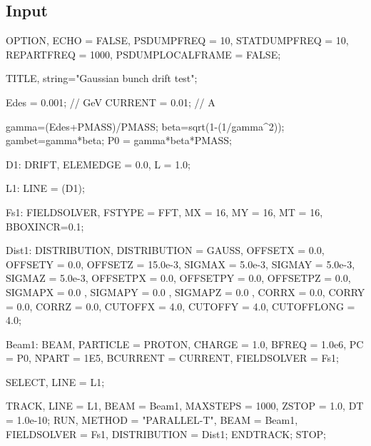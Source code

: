 \subsection{\opal Input}
\begin{longexample}
OPTION, ECHO = FALSE, PSDUMPFREQ = 10,
STATDUMPFREQ = 10, REPARTFREQ = 1000,
PSDUMPLOCALFRAME = FALSE;

TITLE, string="Gaussian bunch drift test";

Edes    = 0.001;        // GeV
CURRENT = 0.01;  // A

gamma=(Edes+PMASS)/PMASS;
beta=sqrt(1-(1/gamma^2));
gambet=gamma*beta;
P0 = gamma*beta*PMASS;

D1: DRIFT, ELEMEDGE = 0.0, L = 1.0;

L1: LINE = (D1);

Fs1: FIELDSOLVER, FSTYPE = FFT, MX = 16, MY = 16, MT = 16, BBOXINCR=0.1;

Dist1: DISTRIBUTION, DISTRIBUTION = GAUSS,
       OFFSETX = 0.0, OFFSETY = 0.0, OFFSETZ = 15.0e-3,
       SIGMAX = 5.0e-3, SIGMAY = 5.0e-3, SIGMAZ = 5.0e-3,
       OFFSETPX = 0.0, OFFSETPY = 0.0, OFFSETPZ = 0.0,
       SIGMAPX = 0.0 , SIGMAPY = 0.0 , SIGMAPZ = 0.0 ,
       CORRX = 0.0, CORRY = 0.0, CORRZ = 0.0,
       CUTOFFX = 4.0, CUTOFFY = 4.0, CUTOFFLONG = 4.0;

Beam1: BEAM, PARTICLE = PROTON, CHARGE = 1.0, BFREQ = 1.0e6, PC = P0,
               NPART = 1E5, BCURRENT = CURRENT, FIELDSOLVER = Fs1;

SELECT, LINE = L1;

TRACK, LINE = L1, BEAM = Beam1, MAXSTEPS = 1000, ZSTOP = 1.0, DT = 1.0e-10;
 RUN, METHOD = "PARALLEL-T", BEAM = Beam1, FIELDSOLVER = Fs1, DISTRIBUTION = Dist1;
ENDTRACK;
STOP;
\end{longexample}

